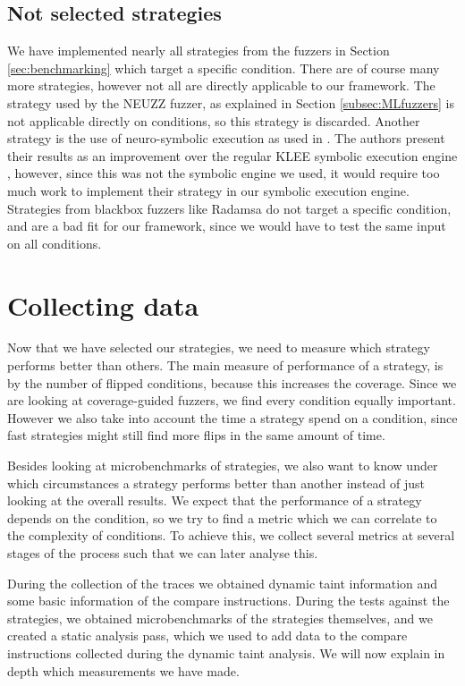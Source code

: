 \subsection{Not selected strategies}
We have implemented nearly all strategies from the fuzzers in Section \ref{sec:benchmarking} which target a specific condition.
There are of course many more strategies, however not all are directly applicable to our framework. 
The strategy used by the NEUZZ fuzzer\cite{she2019neuzz}, as explained in Section \ref{subsec:MLfuzzers} is not applicable directly on conditions, so this strategy is discarded. 
Another strategy is the use of neuro-symbolic execution as used in \cite{shen2019neuro}. The authors present their results as an improvement over the regular KLEE symbolic execution engine \cite{cadar2008klee}, however, since this was not the symbolic engine we used, it would require too much work to implement their strategy in our symbolic execution engine. Strategies from blackbox fuzzers like Radamsa \cite{helin2018radamsa} do not target a specific condition, and are a bad fit for our framework, since we would have to test the same input on all conditions.


\section{Collecting data}\label{sec:collecting-data}
Now that we have selected our strategies, we need to measure which strategy performs better than others. The main measure of performance of a strategy, is by the number of flipped conditions, because this increases the coverage. Since we are looking at coverage-guided fuzzers, we find every condition equally important. However we also take into account the time a strategy spend on a condition, since fast strategies might still find more flips in the same amount of time.

Besides looking at microbenchmarks of strategies, we also want to know under which circumstances a strategy performs better than another instead of just looking at the overall results. We expect that the performance of a strategy depends on the condition, so we try to find a metric which we can correlate to the complexity of conditions. %
To achieve this, we collect several metrics at several stages of the process such that we can later analyse this. 

During the collection of the traces we obtained dynamic taint information and some basic information of the compare instructions. During the tests against the strategies, we obtained microbenchmarks of the strategies themselves, and we created a static analysis pass, which we used to add data to the compare instructions collected during the dynamic taint analysis. We will now explain in depth which measurements we have made.


